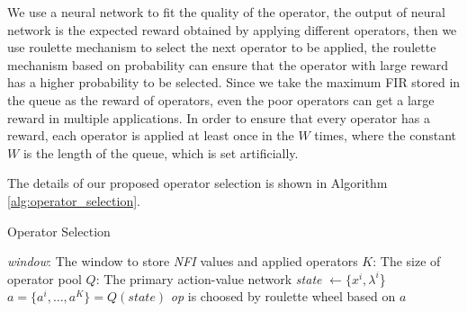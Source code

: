 \documentclass[journal]{IEEEtran}
\begin{document}
We use a neural network to fit the quality of the operator, the output of neural network is the expected reward obtained by applying different operators, then we use roulette mechanism to select the next operator to be applied, the roulette mechanism based on probability can ensure that the operator with large reward has a higher probability to be selected.
Since we take the maximum FIR stored in the queue as the reward of operators, even the poor operators can get a large reward in multiple applications. In order to ensure that every operator has a reward, each operator is applied at least once in the $W$ times, where the constant $W$ is the length of the queue, which is set artificially.

The details of our proposed operator selection is shown in Algorithm \ref{alg:operator_selection}.

\begin{algorithm}
  \label{alg:operator_selection}
  \caption{Operator Selection}
  \small
  \textit{window}: The window to store \textit{NFI} values and applied operators\;  %
  $K$: The size of operator pool\;
  $Q$: The primary action-value network\;
  \textit{state} $\leftarrow \{x^i, \lambda^i$\}\;
  $a = \{ a^i, \dots , a^K \} = Q(\textit{state})$\;
  \textit{op} is choosed by roulette wheel based on $a$\;
  \;
\end{algorithm}

\end{document}

